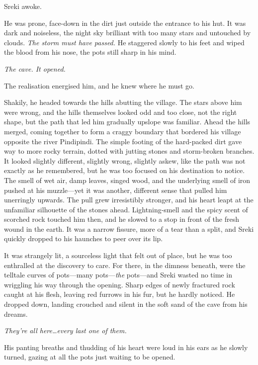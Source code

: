 \secdiv

\noindent Sreki awoke.

He was prone, face-down in the dirt just outside the entrance to his hut. It was dark and noiseless, the night sky brilliant with too many stars and untouched by clouds. \emph{The storm must have passed.} He staggered slowly to his feet and wiped the blood from his nose, the pots still sharp in his mind.

\emph{The cave. It opened.}

The realisation energised him, and he knew where he must go.

Shakily, he headed towards the hills abutting the village. The stars above him were wrong, and the hills themselves looked odd and too close, not the right shape, but the path that led him gradually upslope was familiar. Ahead the hills merged, coming together to form a craggy boundary that bordered his village opposite the river Pindipindi. The simple footing of the hard-packed dirt gave way to more rocky terrain, dotted with jutting stones and storm-broken branches. It looked slightly different, slightly wrong, slightly askew, like the path was not exactly as he remembered, but he was too focused on his destination to notice. The smell of wet air, damp leaves, singed wood, and the underlying smell of iron pushed at his muzzle---yet it was another, different sense that pulled him unerringly upwards. The pull grew irresistibly stronger, and his heart leapt at the unfamiliar silhouette of the stones ahead. Lightning-smell and the spicy scent of scorched rock touched him then, and he slowed to a stop in front of the fresh wound in the earth. It was a narrow fissure, more of a tear than a split, and Sreki quickly dropped to his haunches to peer over its lip.

It was strangely lit, a sourceless light that felt out of place, but he was too enthralled at the discovery to care. For there, in the dimness beneath, were the telltale curves of pots---many pots---\emph{the} pots---and Sreki wasted no time in wriggling his way through the opening. Sharp edges of newly fractured rock caught at his flesh, leaving red furrows in his fur, but he hardly noticed. He dropped down, landing crouched and silent in the soft sand of the cave from his dreams.

\emph{They're all here\ldots{}every last one of them.}

His panting breaths and thudding of his heart were loud in his ears as he slowly turned, gazing at all the pots just waiting to be opened.

